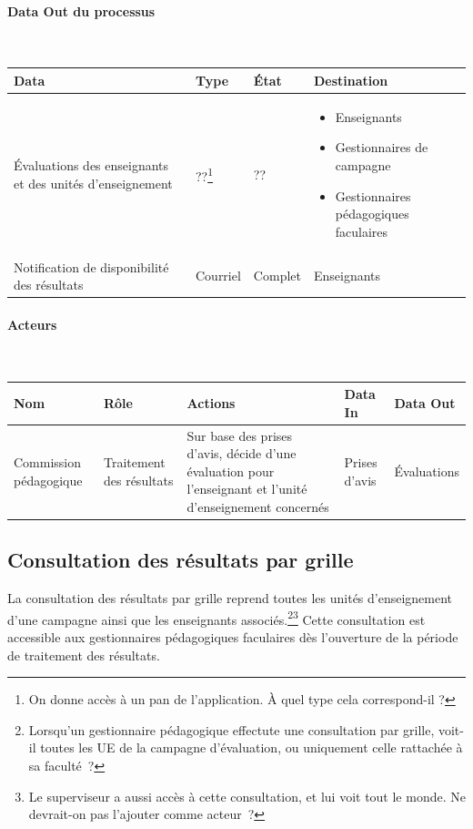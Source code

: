 \documentclass[a4paper,11pt]{report}
\begin{document}
\paragraph{Data Out du processus}~\newline{}

\begin{tabularx}{\linewidth}{|X|X|X|X|} \hline
Data & Type & État & Destination \\ \hline
Évaluations des enseignants et des unités d'enseignement & ??\footnote{On donne accès à un pan de l'application. À quel type cela correspond-il ?} & ?? & 
\begin{itemize}
	\item Enseignants
	\item Gestionnaires de campagne
	\item Gestionnaires pédagogiques faculaires\newline{}
\end{itemize}
\\
Notification de disponibilité des résultats & Courriel & Complet & Enseignants \\ \hline
\end{tabularx}

\paragraph{Acteurs}~\newline{}

\begin{tabularx}{\linewidth}{|X|X|X|X|X|} \hline
Nom & Rôle & Actions & Data In & Data Out \\ \hline 
Commission pédagogique & Traitement des résultats & Sur base des prises d'avis, décide d'une évaluation pour l'enseignant et l'unité d'enseignement concernés & Prises d'avis & Évaluations \\ \hline
\end{tabularx}






\subsection{Consultation des résultats par grille}
La consultation des résultats par grille reprend toutes les unités d'enseignement  d'une campagne ainsi que les enseignants associés.\footnote{Lorsqu'un gestionnaire pédagogique effectute une consultation par grille, voit-il toutes les UE de la campagne d'évaluation, ou uniquement celle rattachée à sa faculté~?}\footnote{Le superviseur a aussi accès à cette consultation, et lui voit tout le monde. Ne devrait-on pas l'ajouter comme acteur~?}
Cette consultation est accessible aux gestionnaires pédagogiques faculaires dès l'ouverture de la période de traitement des résultats.
\end{document}
